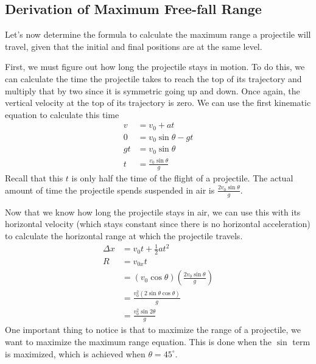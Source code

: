 \documentclass[11pt]{article}
\begin{document}
\subsection{Derivation of Maximum Free-fall Range}

Let's now determine the formula to calculate the maximum range a projectile will travel, given that the initial and final positions are at the same level. 

First, we must figure out how long the projectile stays in motion. To do this, we can calculate the time the projectile takes to reach the top of its trajectory and multiply that by two since it is symmetric going up and down. Once again, the vertical velocity at the top of its trajectory is zero. We can use the first kinematic equation to calculate this time
\begin{align*}
    v &= v_0 + at \\
    0 &= v_0\sin{\theta} - gt \\
    gt &= v_0\sin{\theta}\\
    t &= \frac{v_0\sin{\theta}}{g}
\end{align*}
Recall that this $t$ is only half the time of the flight of a projectile. The actual amount of time the projectile spends suspended in air is $\frac{2v_0\sin{\theta}}{g}$. 

Now that we know how long the projectile stays in air, we can use this with its horizontal velocity (which stays constant since there is no horizontal acceleration) to calculate the horizontal range at which the projectile travels.
\begin{align*}
    \Delta x &= v_0 t + \frac{1}{2}at^2 \\
    R &= v_{0x}t \\
      &= (v_{0}\cos{\theta})\left(\frac{2v_0\sin{\theta}}{g}\right) \\
      &= \frac{v_{0}^{2}(2\sin{\theta}\cos{\theta})}{g} \\
      &= \frac{v_{0}^{2}\sin{2\theta}}{g}
\end{align*}
One important thing to notice is that to maximize the range of a projectile, we want to maximize the maximum range equation. This is done when the $\sin$ term is maximized, which is achieved when $\theta = 45^{\circ}$. 
\end{document}
